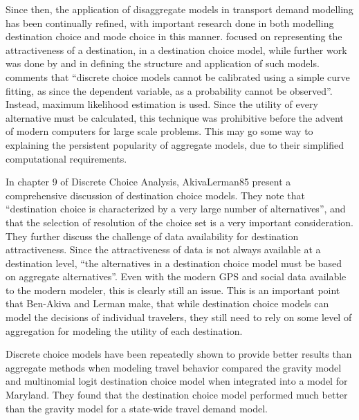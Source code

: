 Since then, the application of disaggregate models in transport demand modelling has been continually refined, with important research done in both modelling destination choice and mode choice in this manner. \textcite{Daly82} focused on representing the attractiveness of a destination, in a destination choice model, while further work was done by \textcite{Akiva74} and \textcite{Anas81} in defining the structure and application of such models. \textcite{Train09} comments that \enquote{discrete choice models cannot be calibrated using a simple curve fitting, as since the dependent variable, as a probability cannot be observed}. Instead, maximum likelihood estimation is used. Since the utility of every alternative must be calculated, this technique was prohibitive before the advent of modern computers for large scale problems. This may go some way to explaining the persistent popularity of aggregate models, due to their simplified computational requirements.

In chapter 9 of Discrete Choice Analysis, {AkivaLerman85} present a comprehensive discussion of destination choice models. They note that \enquote{destination choice is characterized by a very large number of alternatives}, and that the selection of resolution of the choice set is a very important consideration. They further discuss the challenge of data availability for destination attractiveness. Since the attractiveness of data is not always available at a destination level, \enquote{the alternatives in a destination choice model must be based on aggregate alternatives}. Even with the modern GPS and social data available to the modern modeler, this is clearly still an issue. This is an important point that Ben-Akiva and Lerman make, that while destination choice models can model the decisions of individual travelers, they still need to rely on some level of aggregation for modeling the utility of each destination.

Discrete choice models have been repeatedly shown to provide better results than aggregate methods when modeling travel behavior \parencite*{Stephanedes84, Mishra13} compared the gravity model and multinomial logit destination choice model when integrated into a model for Maryland. They found that the destination choice model performed much better than the gravity model for a state-wide travel demand model. 


